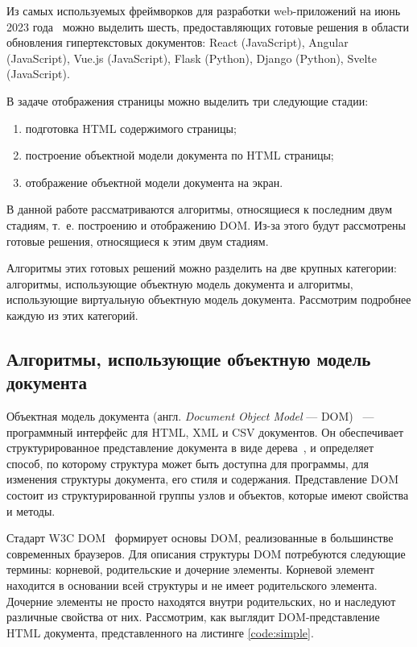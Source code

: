 Из самых используемых фреймворков для разработки web-приложений на июнь 2023 года~\cite{web-frameworks-statistics} можно выделить шесть, предоставляющих готовые решения в области обновления гипертекстовых документов: React (JavaScript), Angular (JavaScript), Vue.js (JavaScript), Flask (Python), Django (Python), Svelte (JavaScript). 

В задаче отображения страницы можно выделить три следующие стадии:
\begin{enumerate}[label=\arabic*)]
	\item подготовка HTML содержимого страницы;
	\item построение объектной модели документа по HTML страницы;
	\item отображение объектной модели документа на экран.
\end{enumerate}

В данной работе рассматриваются алгоритмы, относящиеся к последним двум стадиям, т.~е. построению и отображению DOM.
Из-за этого будут рассмотрены готовые  решения, относящиеся к этим двум стадиям.

Алгоритмы этих готовых решений можно разделить на две крупных категории: алгоритмы, использующие объектную модель документа и алгоритмы, использующие виртуальную объектную модель документа.
Рассмотрим подробнее каждую из этих категорий.

\subsection{Алгоритмы, использующие объектную модель  документа}

Объектная модель документа (англ. \textit{Document Object Model} --- DOM)~\cite{dom} --- программный интерфейс для HTML, XML и CSV документов.
Он обеспечивает структурированное представление документа в виде дерева~\cite{balanced-tree}, и определяет способ, по которому структура может быть доступна для программы, для изменения структуры документа, его стиля и содержания.
Представление DOM состоит из структурированной группы узлов и объектов, которые имеют свойства и методы.

Стадарт W3C DOM~\cite{dom-doc} формирует основы DOM, реализованные в большинстве современных браузеров.
Для описания структуры DOM потребуются следующие термины: корневой, родительские и дочерние элементы.
Корневой элемент находится в основании всей структуры и не имеет родительского элемента.
Дочерние элементы не просто находятся внутри родительских, но и наследуют различные свойства от них.
Рассмотрим, как выглядит DOM-представление HTML документа, представленного на листинге \ref{code:simple}.

